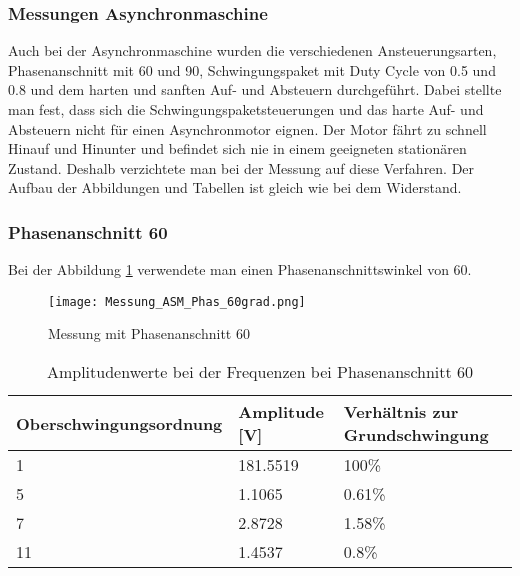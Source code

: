 \subsubsection{Messungen Asynchronmaschine}

Auch bei der Asynchronmaschine wurden die verschiedenen Ansteuerungsarten, Phasenanschnitt mit 60\textdegree \hspace{0.02cm} und 90\textdegree \hspace{0.02cm}, Schwingungspaket mit Duty Cycle von 0.5 und 0.8 und dem harten und sanften Auf- und Absteuern durchgeführt. Dabei stellte man fest, dass sich die Schwingungspaketsteuerungen und das harte Auf- und Absteuern nicht für einen Asynchronmotor eignen. Der Motor fährt zu schnell Hinauf und Hinunter und befindet sich nie in einem geeigneten stationären Zustand. Deshalb verzichtete man bei der Messung auf diese Verfahren. Der Aufbau der Abbildungen und Tabellen ist gleich wie bei dem Widerstand.

\subsubsection*{Phasenanschnitt 60\textdegree}

Bei der Abbildung \ref{fig:Mess_ASM_Phas60} verwendete man einen Phasenanschnittswinkel von 60\textdegree.

\begin{figure}[ht!]
	\centering
	\texttt{[image: Messung\_ASM\_Phas\_60grad.png]}	
	\caption{Messung mit Phasenanschnitt 60\textdegree}\label{fig:Mess_ASM_Phas60}
\end{figure}


\newpage
\begin{table}[ht!]
	\centering
	\begin{tabular}{|l|l|l|}
		\hline
		Oberschwingungsordnung & Amplitude {[}V{]} & Verhältnis zur Grundschwingung \\ \hline
		1                      & 181.5519          & 100\%                          \\ \hline
		5                      & 1.1065            & 0.61\%                         \\ \hline
		7                      & 2.8728            & 1.58\%                         \\ \hline
		11                     & 1.4537            & 0.8\%                          \\ \hline
	\end{tabular}
\caption{Amplitudenwerte bei der Frequenzen bei Phasenanschnitt 60\textdegree}\label{tab:Mess_Spannung_ASM_Phas60}
\end{table}

